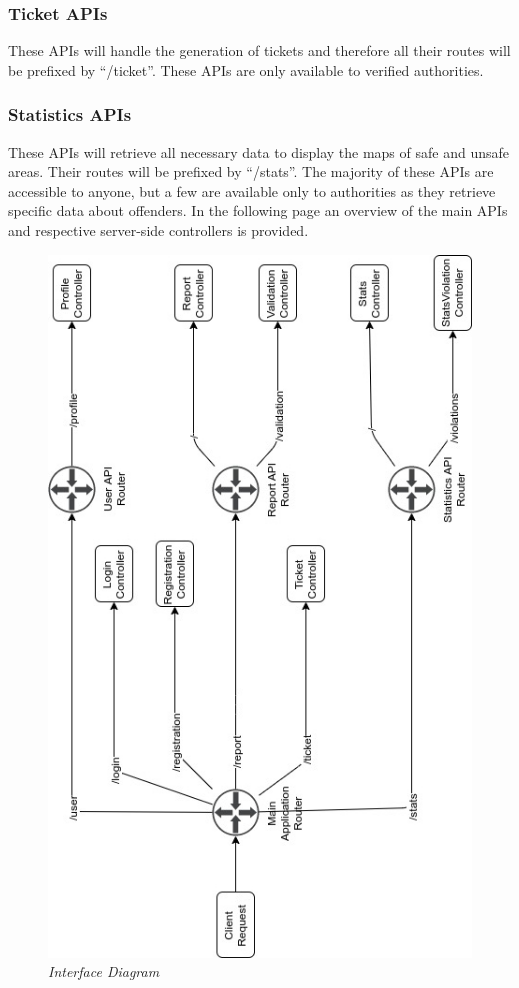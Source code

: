 \subsubsection{Ticket APIs}
These APIs will handle the generation of tickets and therefore all their routes will be prefixed by “/ticket”. These APIs are only available to verified authorities.

\subsubsection{Statistics APIs}
These APIs will retrieve all necessary data to display the maps of safe and unsafe areas. Their routes will be prefixed by “/stats”. The majority of these APIs are accessible to anyone, but a few are available only to authorities as they retrieve specific data about offenders.
\newline
\newline
In the following page an overview of the main APIs and respective server-side controllers is provided.
\newpage
\begin{figure}[H]
  \centering
  \includegraphics[origin=c,width=\textwidth,height=.95\textheight,keepaspectratio]{DD_Images/ComponentInterface/InterfaceDiagram.jpg}
  \caption{\textit{Interface Diagram}}
\end{figure}